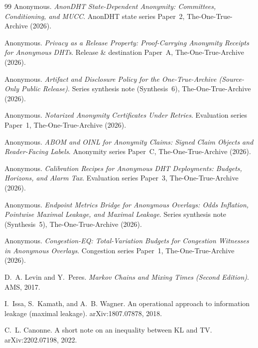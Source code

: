 \documentclass[11pt]{article}
\begin{document}
\begin{thebibliography}{99}\small
{}
Anonymous.
\newblock \emph{AnonDHT State-Dependent Anonymity: Committees, Conditioning, and MUCC}.
\newblock AnonDHT state series Paper~2, The-One-True-Archive (2026).

Anonymous.
\newblock \emph{Privacy as a Release Property: Proof-Carrying Anonymity Receipts for Anonymous DHTs}.
\newblock Release \& destination Paper~A, The-One-True-Archive (2026).


Anonymous.
\newblock \emph{Artifact and Disclosure Policy for the One-True-Archive (Source-Only Public Release)}.
\newblock Series synthesis note (Synthesis~6), The-One-True-Archive (2026).

Anonymous.
\newblock \emph{Notarized Anonymity Certificates Under Retries}.
\newblock Evaluation series Paper~1, The-One-True-Archive (2026).

Anonymous.
\newblock \emph{ABOM and OINL for Anonymity Claims: Signed Claim Objects and Reader-Facing Labels}.
\newblock Anonymity series Paper~C, The-One-True-Archive (2026).

Anonymous.
\newblock \emph{Calibration Recipes for Anonymous DHT Deployments: Budgets, Horizons, and Alarm Tax}.
\newblock Evaluation series Paper~3, The-One-True-Archive (2026).

Anonymous.
\newblock \emph{Endpoint Metrics Bridge for Anonymous Overlays: Odds Inflation, Pointwise Maximal Leakage, and Maximal Leakage}.
\newblock Series synthesis note (Synthesis~5), The-One-True-Archive (2026).

Anonymous.
\newblock \emph{Congestion-EQ: Total-Variation Budgets for Congestion Witnesses in Anonymous Overlays}.
\newblock Congestion series Paper~1, The-One-True-Archive (2026).

D.~A. Levin and Y.~Peres.
\newblock \emph{Markov Chains and Mixing Times (Second Edition)}.
\newblock AMS, 2017.

I.~Issa, S.~Kamath, and A.~B. Wagner.
\newblock An operational approach to information leakage (maximal leakage).
\newblock arXiv:1807.07878, 2018.

C.~L. Canonne.
\newblock A short note on an inequality between {KL} and {TV}.
\newblock arXiv:2202.07198, 2022.


\end{thebibliography}
\end{document}
